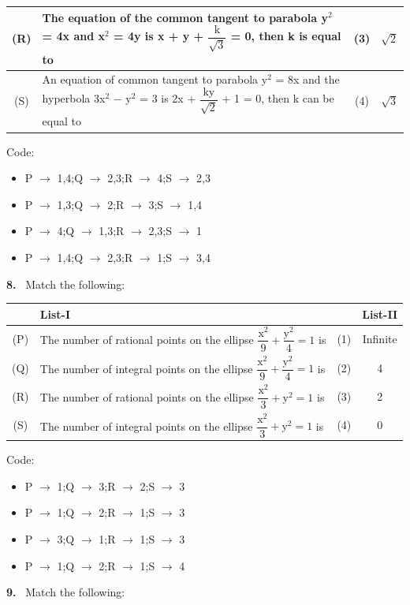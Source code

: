 \documentclass[10pt]{extarticle}
\newcommand{\qn}[1]{\par\smallskip\noindent\textbf{#1.}~}
\newenvironment{qoptions}{\begin{itemize}[leftmargin=1.8em,itemsep=1pt,topsep=2pt,label={}]}{\end{itemize}}
\newcommand{\opt}[2]{\item[(#1)] #2}
\begin{document}
\begin{multicols}{2}
{\begin{tabular}{|c|L{4.6cm}|c|c|}
\hline
(R) & The equation of the common tangent to parabola y$^2$ = 4x and x$^2$ = 4y is x + y + $\dfrac{\text{k}}{\sqrt{3}}$ = 0, then k is equal to & (3) & $\sqrt{2}$ \\
\hline
(S) & An equation of common tangent to parabola y$^2$ = 8x and the hyperbola 3x$^2$ $-$ y$^2$ = 3 is 2x + $\dfrac{\text{ky}}{\sqrt{2}}$ + 1 = 0, then k can be equal to & (4) & $\sqrt{3}$ \\
\hline
\end{tabular}}\par
Code:
\begin{qoptions}
\opt{A}{P $\rightarrow$ 1,4;Q $\rightarrow$ 2,3;R $\rightarrow$ 4;S $\rightarrow$ 2,3}
\opt{B}{P $\rightarrow$ 1,3;Q $\rightarrow$ 2;R $\rightarrow$ 3;S $\rightarrow$ 1,4}
\opt{C}{P $\rightarrow$ 4;Q $\rightarrow$ 1,3;R $\rightarrow$ 2,3;S $\rightarrow$ 1}
\opt{D}{P $\rightarrow$ 1,4;Q $\rightarrow$ 2,3;R $\rightarrow$ 1;S $\rightarrow$ 3,4}
\end{qoptions}
\qn{8} Match the following:\par
{\footnotesize\setlength{\tabcolsep}{1.5pt}\noindent\begin{tabular}{|c|L{4.8cm}|c|c|}
\hline
 & List-I & & List-II \\
\hline
(P) & The number of rational points on the ellipse $\dfrac{\text{x}^2}{9}+\dfrac{\text{y}^2}{4}=1$ is & (1) & Infinite \\
\hline
(Q) & The number of integral points on the ellipse $\dfrac{\text{x}^2}{9}+\dfrac{\text{y}^2}{4}=1$ is & (2) & 4 \\
\hline
(R) & The number of rational points on the ellipse $\dfrac{\text{x}^2}{3}+\text{y}^2=1$ is & (3) & 2 \\
\hline
(S) & The number of integral points on the ellipse $\dfrac{\text{x}^2}{3}+\text{y}^2=1$ is & (4) & 0 \\
\hline
\end{tabular}}\par
Code:
\begin{qoptions}
\opt{A}{P $\rightarrow$ 1;Q $\rightarrow$ 3;R $\rightarrow$ 2;S $\rightarrow$ 3}
\opt{B}{P $\rightarrow$ 1;Q $\rightarrow$ 2;R $\rightarrow$ 1;S $\rightarrow$ 3}
\opt{C}{P $\rightarrow$ 3;Q $\rightarrow$ 1;R $\rightarrow$ 1;S $\rightarrow$ 3}
\opt{D}{P $\rightarrow$ 1;Q $\rightarrow$ 2;R $\rightarrow$ 1;S $\rightarrow$ 4}
\end{qoptions}
\qn{9} Match the following:\par
{\footnotesize\setlength{\tabcolsep}{1.5pt}\noindent\begin{tabular}{|c|L{4.8cm}|c|c|}

\end{tabular}}
\end{multicols}
\end{document}
